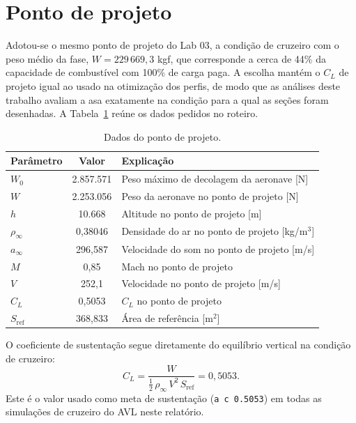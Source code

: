 \newpage
\section{Ponto de projeto}

Adotou-se o mesmo ponto de projeto do Lab 03, a condição de cruzeiro com o
peso médio da fase, $W = 229\,669{,}3$ kgf, que corresponde a cerca de 44\%
da capacidade de combustível com 100\% de carga paga. A escolha mantém o
$C_L$ de projeto igual ao usado na otimização dos perfis, de modo que as
análises deste trabalho avaliam a asa exatamente na condição para a qual as
seções foram desenhadas. A Tabela~\ref{tab:ponto_projeto} reúne os dados
pedidos no roteiro.

\begin{table}[H]
\centering
\caption{Dados do ponto de projeto.}\label{tab:ponto_projeto}
\renewcommand{\arraystretch}{1.25}
\begin{tabular}{lcl}
\toprule
Parâmetro & Valor & Explicação \\
\midrule
$W_0$ & 2.857.571 & Peso máximo de decolagem da aeronave [N] \\
$W$ & 2.253.056 & Peso da aeronave no ponto de projeto [N] \\
$h$ & 10.668 & Altitude no ponto de projeto [m] \\
$\rho_\infty$ & 0,38046 & Densidade do ar no ponto de projeto [kg/m$^3$] \\
$a_\infty$ & 296,587 & Velocidade do som no ponto de projeto [m/s] \\
$M$ & 0,85 & Mach no ponto de projeto \\
$V$ & 252,1 & Velocidade no ponto de projeto [m/s] \\
$C_L$ & 0,5053 & $C_L$ no ponto de projeto \\
$S_{\mathrm{ref}}$ & 368,833 & Área de referência [m$^2$] \\
\bottomrule
\end{tabular}
\end{table}

O coeficiente de sustentação segue diretamente do equilíbrio vertical na
condição de cruzeiro:
\begin{equation*}
    C_L = \frac{W}{\tfrac{1}{2}\,\rho_\infty\,V^2\,S_{\mathrm{ref}}}
        = 0{,}5053.
\end{equation*}
Este é o valor usado como meta de sustentação (\texttt{a c 0.5053}) em todas
as simulações de cruzeiro do AVL neste relatório.
